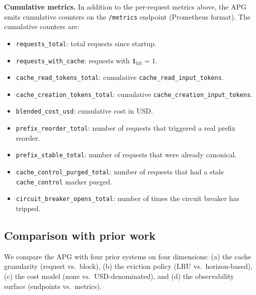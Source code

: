 \noindent
\textbf{Cumulative metrics.} In addition to the per-request
metrics above, the APG emits cumulative counters on the
\texttt{/metrics} endpoint (Prometheus format). The
cumulative counters are:

\begin{itemize}
  \item \texttt{requests\_total}: total requests since startup.
  \item \texttt{requests\_with\_cache}: requests with
        $\mathbf{1}_{\text{hit}} = 1$.
  \item \texttt{cache\_read\_tokens\_total}: cumulative
        \texttt{cache\_read\_input\_tokens}.
  \item \texttt{cache\_creation\_tokens\_total}: cumulative
        \texttt{cache\_creation\_input\_tokens}.
  \item \texttt{blended\_cost\_usd}: cumulative cost in USD.
  \item \texttt{prefix\_reorder\_total}: number of requests
        that triggered a real prefix reorder.
  \item \texttt{prefix\_stable\_total}: number of requests
        that were already canonical.
  \item \texttt{cache\_control\_purged\_total}: number of
        requests that had a stale \texttt{cache\_control}
        marker purged.
  \item \texttt{circuit\_breaker\_opens\_total}: number of
        times the circuit breaker has tripped.
\end{itemize}

\subsection{Comparison with prior work}
\label{app:apg:comparison}

We compare the APG with four prior systems on four dimensions:
(a) the cache granularity (request vs.\ block), (b) the eviction
policy (LRU vs.\ horizon-based), (c) the cost model (none vs.\
USD-denominated), and (d) the observability surface
(endpoints vs.\ metrics).

